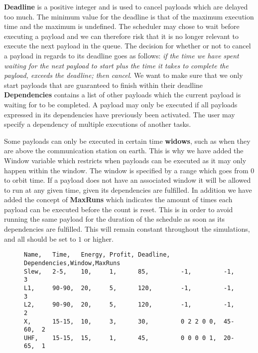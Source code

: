 \textbf{Deadline} is a positive integer and is used to cancel payloads which are delayed too much.
The minimum value for the deadline is that of the maximum execution time and the maximum is undefined.
The scheduler may chose to wait before executing a payload and we can therefore risk that it is no longer relevant to execute the next payload in the queue.
The decision for whether or not to cancel a payload in regards to its deadline goes as follows: \textit{if the time we have spent waiting for the next payload to start plus the time it takes to complete the payload, exceeds the deadline; then cancel}. We want to make sure that we only start payloads that are guaranteed to finish within their deadline\\
\textbf{Dependencies} contains a list of other payloads which the current payload is waiting for to be completed. A payload may only be executed if all payloads expressed in its dependencies have previously been activated. The user may specify a dependency of multiple executions of another tasks.

Some payloads can only be executed in certain time \textbf{widows}, such as when they are above the communication station on earth.
This is why we have added the Window variable which restricts when payloads can be executed as it may only happen within the window. The window is specified by a range which goes from 0 to orbit time. If a payload does not have an associated window it will be allowed to run at any given time, given its dependencies are fulfilled.
In addition we have added the concept of \textbf{MaxRuns} which indicates the amount of times each payload can be executed before the count is reset. This is in order to avoid running the same payload for the duration of the schedule as soon as its dependencies are fulfilled. This will remain constant throughout the simulations, and all should be set to $1$ or higher. 
\begin{figure}[H]
\begin{lstlisting}[caption={An example of how five payloads can be defined}, label=lst:csv, language=text]
Name,	Time,	Energy,	Profit,	Deadline,	Dependencies,Window,MaxRuns
Slew,	2-5,	10,		1,		85,			-1,			-1,		3
L1,		90-90,	20,		5,		120,		-1,			-1,		3
L2,		90-90,	20,		5,		120,		-1,			-1,		2
X,		15-15,	10,		3,		30,			0 2 2 0 0,	45-60,	2
UHF,	15-15,	15,		1,		45,			0 0 0 0 1,	20-65,	1
\end{lstlisting}
\end{figure}

